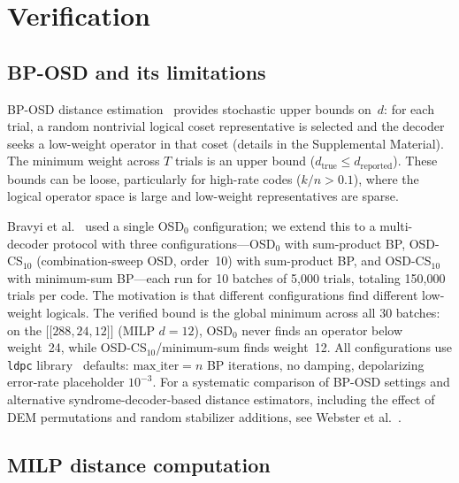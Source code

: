 \documentclass[aps,prxquantum,twocolumn,superscriptaddress,nofootinbib]{revtex4-2}
\newcommand{\dblbrk}[1]{\ensuremath{\lbrack\!\lbrack #1 \rbrack\!\rbrack}}
\newcommand{\code}[1]{\dblbrk{#1}}
\begin{document}
\section{Verification}
\label{sec:verification}

\subsection{BP-OSD and its limitations}
\label{sec:bposd_limits}

BP-OSD distance estimation~\cite{panteleev2021degenerate,roffe2020decoding,bravyi2024high} provides stochastic upper bounds on~$d$: for each trial, a random nontrivial logical coset representative is selected and the decoder seeks a low-weight operator in that coset (details in the Supplemental Material).
The minimum weight across $T$ trials is an upper bound ($d_{\text{true}} \leq d_{\text{reported}}$).
These bounds can be loose, particularly for high-rate codes ($k/n > 0.1$), where the logical operator space is large and low-weight representatives are sparse.

Bravyi et al.~\cite{bravyi2024high} used a single OSD$_0$ configuration; we extend this to a multi-decoder protocol with three configurations---OSD$_0$ with sum-product BP, OSD-CS$_{10}$ (combination-sweep OSD, order~10) with sum-product BP, and OSD-CS$_{10}$ with minimum-sum BP---each run for 10 batches of 5{,}000 trials, totaling 150{,}000 trials per code.
The motivation is that different configurations find different low-weight logicals.
The verified bound is the global minimum across all 30 batches: on the $\code{288,24,12}$ (MILP $d = 12$), OSD$_0$ never finds an operator below weight~24, while OSD-CS$_{10}$/minimum-sum finds weight~12.
All configurations use \texttt{ldpc} library~\cite{ldpc_library} defaults: $\mathrm{max\_iter} = n$ BP iterations, no damping, depolarizing error-rate placeholder $10^{-3}$.
For a systematic comparison of BP-OSD settings and alternative syndrome-decoder-based distance estimators, including the effect of DEM permutations and random stabilizer additions, see Webster et al.~\cite{webster2026distance}.

\subsection{MILP distance computation}
\label{sec:milp}
\end{document}
